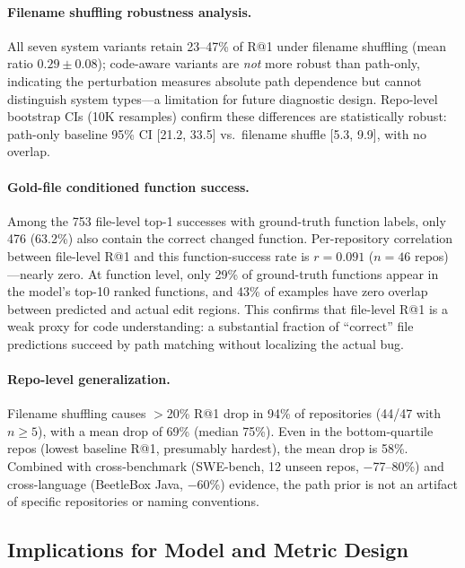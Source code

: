 \documentclass{article}
\begin{document}
\paragraph{Filename shuffling robustness analysis.}
All seven system variants retain 23--47\% of R@1 under filename shuffling (mean ratio $0.29 \pm 0.08$); code-aware variants are \emph{not} more robust than path-only, indicating the perturbation measures absolute path dependence but cannot distinguish system types---a limitation for future diagnostic design.
Repo-level bootstrap CIs (10K resamples) confirm these differences are statistically robust: path-only baseline 95\% CI [21.2, 33.5] vs.\ filename shuffle [5.3, 9.9], with no overlap.

\paragraph{Gold-file conditioned function success.}
Among the 753 file-level top-1 successes with ground-truth function labels, only 476 (63.2\%) also contain the correct changed function.
Per-repository correlation between file-level R@1 and this function-success rate is $r = 0.091$ ($n = 46$ repos)---nearly zero.
At function level, only 29\% of ground-truth functions appear in the model's top-10 ranked functions, and 43\% of examples have zero overlap between predicted and actual edit regions.
This confirms that file-level R@1 is a weak proxy for code understanding: a substantial fraction of ``correct'' file predictions succeed by path matching without localizing the actual bug.

\paragraph{Repo-level generalization.}
Filename shuffling causes $>$20\% R@1 drop in 94\% of repositories (44/47 with $n \geq 5$), with a mean drop of 69\% (median 75\%).
Even in the bottom-quartile repos (lowest baseline R@1, presumably hardest), the mean drop is 58\%.
Combined with cross-benchmark (SWE-bench, 12 unseen repos, $-$77--80\%) and cross-language (BeetleBox Java, $-$60\%) evidence, the path prior is not an artifact of specific repositories or naming conventions.


\subsection{Implications for Model and Metric Design}
\label{sec:towards}
\end{document}
